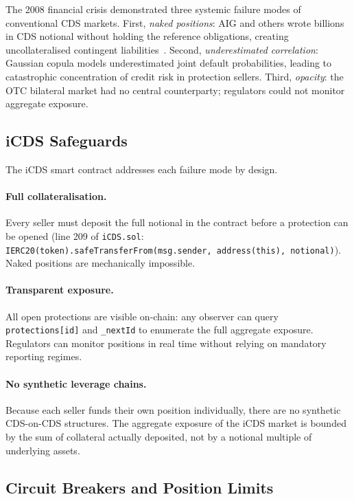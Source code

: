 \documentclass[12pt]{article}
\theoremstyle{plain}
\theoremstyle{definition}
\theoremstyle{remark}
\begin{document}
The 2008 financial crisis demonstrated three systemic failure modes of
conventional CDS markets.
First, \emph{naked positions}: AIG and others wrote billions in CDS notional
without holding the reference obligations, creating uncollateralised
contingent liabilities~\cite{Cont2010}.
Second, \emph{underestimated correlation}: Gaussian copula models underestimated
joint default probabilities, leading to catastrophic concentration of
credit risk in protection sellers.
Third, \emph{opacity}: the OTC bilateral market had no central counterparty;
regulators could not monitor aggregate exposure.

\subsection{iCDS Safeguards}

The iCDS smart contract addresses each failure mode by design.

\paragraph{Full collateralisation.}
Every seller must deposit the full notional in the contract before a
protection can be opened (line 209 of \texttt{iCDS.sol}:
\texttt{IERC20(token).safeTransferFrom(msg.sender, address(this), notional)}).
Naked positions are mechanically impossible.

\paragraph{Transparent exposure.}
All open protections are visible on-chain: any observer can query
\texttt{protections[id]} and \texttt{\_nextId} to enumerate the full
aggregate exposure.
Regulators can monitor positions in real time without relying on mandatory
reporting regimes.

\paragraph{No synthetic leverage chains.}
Because each seller funds their own position individually, there are no
synthetic CDS-on-CDS structures.
The aggregate exposure of the iCDS market is bounded by the sum of
collateral actually deposited, not by a notional multiple of underlying assets.

\subsection{Circuit Breakers and Position Limits}
\end{document}
